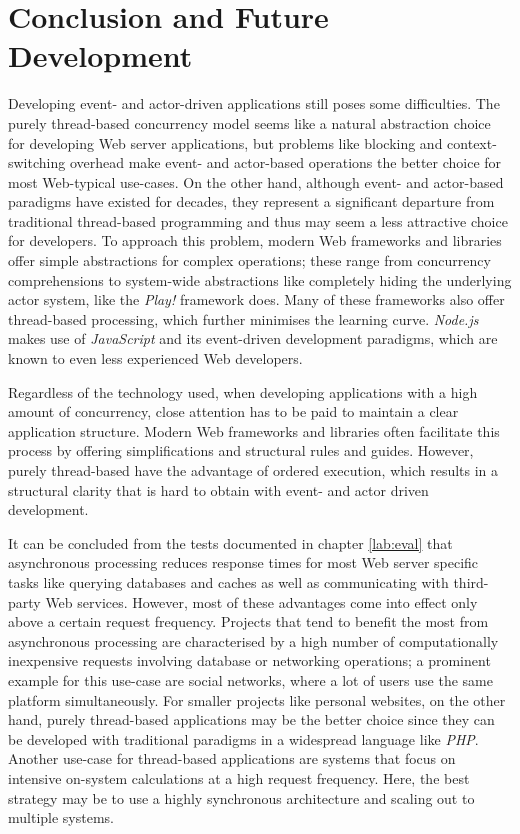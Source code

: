 \chapter{Conclusion and Future Development}
\label{lab:conclusion}
Developing event- and actor-driven applications still poses some difficulties. The purely thread-based concurrency model seems like a natural abstraction choice for developing Web server applications, but problems like blocking and context-switching overhead make event- and actor-based operations the better choice for most Web-typical use-cases. On the other hand, although event- and actor-based paradigms have existed for decades, they represent a significant departure from traditional thread-based programming and thus may seem a less attractive choice for developers. To approach this problem, modern Web frameworks and libraries offer simple abstractions for complex operations; these range from concurrency comprehensions to system-wide abstractions like completely hiding the underlying actor system, like the \textit{Play!} framework does. Many of these frameworks also offer thread-based processing, which further minimises the learning curve. \textit{Node.js} makes use of \textit{JavaScript} and its event-driven development paradigms, which are known to even less experienced Web developers. 

Regardless of the technology used, when developing applications with a high amount of concurrency, close attention has to be paid to maintain a clear application structure. Modern Web frameworks and libraries often facilitate this process by offering simplifications and structural rules and guides. However, purely thread-based have the advantage of ordered execution, which results in a structural clarity that is hard to obtain with event- and actor driven development.

It can be concluded from the tests documented in chapter \ref{lab:eval} that asynchronous processing reduces response times for most Web server specific tasks like querying databases and caches as well as communicating with third-party Web services. However, most of these advantages come into effect only above a certain request frequency. Projects that tend to benefit the most from asynchronous processing are characterised by a high number of computationally inexpensive requests involving database or networking operations; a prominent example for this use-case are social networks, where a lot of users use the same platform simultaneously. For smaller projects like personal websites, on the other hand, purely thread-based applications may be the better choice since they can be developed with traditional paradigms in a widespread language like \textit{PHP}. Another use-case for thread-based applications are systems that focus on intensive on-system calculations at a high request frequency. Here, the best strategy may be to use a highly synchronous architecture and scaling out to multiple systems. 

